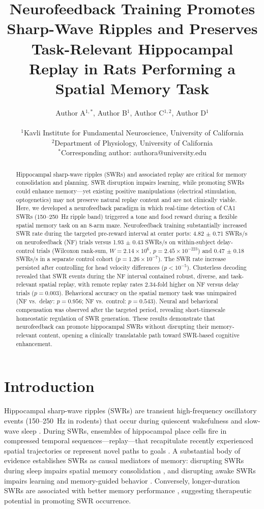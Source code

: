 \documentclass[11pt]{article}
\title{Neurofeedback Training Promotes Sharp-Wave Ripples and Preserves Task-Relevant Hippocampal Replay in Rats Performing a Spatial Memory Task}
\author{
Author A$^{1,*}$, Author B$^{1}$, Author C$^{1,2}$, Author D$^{1}$ \\
\\
$^{1}$Kavli Institute for Fundamental Neuroscience, University of California \\
$^{2}$Department of Physiology, University of California \\
$^{*}$Corresponding author: authora@university.edu
}
\date{}
\begin{document}
\maketitle

\begin{abstract}
Hippocampal sharp-wave ripples (SWRs) and associated replay are critical for memory consolidation and planning. SWR disruption impairs learning, while promoting SWRs could enhance memory---yet existing positive manipulations (electrical stimulation, optogenetics) may not preserve natural replay content and are not clinically viable. Here, we developed a neurofeedback paradigm in which real-time detection of CA1 SWRs (150--250~Hz ripple band) triggered a tone and food reward during a flexible spatial memory task on an 8-arm maze. Neurofeedback training substantially increased SWR rate during the targeted pre-reward interval at center ports: 4.82 $\pm$ 0.71 SWRs/s on neurofeedback (NF) trials versus 1.93 $\pm$ 0.43 SWRs/s on within-subject delay-control trials (Wilcoxon rank-sum, $W = 2.14 \times 10^6$, $p = 2.45 \times 10^{-223}$) and 0.47 $\pm$ 0.18 SWRs/s in a separate control cohort ($p = 1.26 \times 10^{-7}$). The SWR rate increase persisted after controlling for head velocity differences ($p < 10^{-5}$). Clusterless decoding revealed that SWR events during the NF interval contained robust, diverse, and task-relevant spatial replay, with remote replay rates 2.34-fold higher on NF versus delay trials ($p = 0.003$). Behavioral accuracy on the spatial memory task was unimpaired (NF vs.\ delay: $p = 0.956$; NF vs.\ control: $p = 0.543$). Neural and behavioral compensation was observed after the targeted period, revealing short-timescale homeostatic regulation of SWR generation. These results demonstrate that neurofeedback can promote hippocampal SWRs without disrupting their memory-relevant content, opening a clinically translatable path toward SWR-based cognitive enhancement.
\end{abstract}

\section{Introduction}

Hippocampal sharp-wave ripples (SWRs) are transient high-frequency oscillatory events (150--250~Hz in rodents) that occur during quiescent wakefulness and slow-wave sleep \citep{buzsaki2015}. During SWRs, ensembles of hippocampal place cells fire in compressed temporal sequences---replay---that recapitulate recently experienced spatial trajectories or represent novel paths to goals \citep{foster2006, pfeiffer2013, diba2007}. A substantial body of evidence establishes SWRs as causal mediators of memory: disrupting SWRs during sleep impairs spatial memory consolidation \citep{girardeau2009, ego-stengel2010}, and disrupting awake SWRs impairs learning and memory-guided behavior \citep{jadhav2012}. Conversely, longer-duration SWRs are associated with better memory performance \citep{fernandez-ruiz2019}, suggesting therapeutic potential in promoting SWR occurrence.
\end{document}
